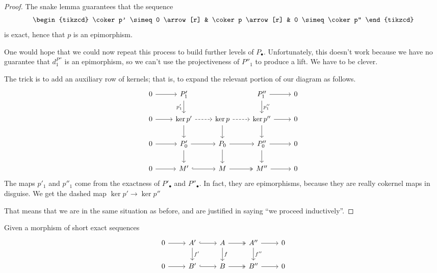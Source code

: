 \documentclass[main.tex]{subfiles}
\begin{document}
\begin{proof}
  The snake lemma guarantees that the sequence
  \begin{equation*}
    \begin{tikzcd}
      \coker p' \simeq 0
      \arrow[r]
      & \coker p
      \arrow[r]
      & 0 \simeq \coker p''
    \end{tikzcd}
  \end{equation*}
  is exact, hence that $p$ is an epimorphism.

  One would hope that we could now repeat this process to build further levels of $P_{\bullet}$. Unfortunately, this doesn't work because we have no guarantee that $d^{P''}_{1}$ is an epimorphism, so we can't use the projectiveness of $P''_{1}$ to produce a lift. We have to be clever.

  The trick is to add an auxiliary row of kernels; that is, to expand the relevant portion of our diagram as follows.
  \begin{equation*}
    \begin{tikzcd}
      0
      \arrow[r]
      & P'_{1}
      \arrow[d, swap, "p_{1}'"]
      && P''_{1}
      \arrow[r]
      \arrow[d, "p_{1}''"]
      & 0
      \\
      0
      \arrow[r]
      & \ker p'
      \arrow[r, dashed]
      \arrow[d]
      & \ker p
      \arrow[r, dashed]
      \arrow[d]
      & \ker p''
      \arrow[r]
      \arrow[d]
      & 0
      \\
      0
      \arrow[r]
      & P'_{0}
      \arrow[r]
      \arrow[d]
      & P_{0}
      \arrow[r]
      \arrow[d]
      & P''_{0}
      \arrow[r]
      \arrow[d]
      & 0
      \\
      0
      \arrow[r]
      & M'
      \arrow[r, hook]
      & M
      \arrow[r, two heads]
      & M''
      \arrow[r]
      & 0
    \end{tikzcd}
  \end{equation*}
  The maps $p'_{1}$ and $p''_{1}$ come from the exactness of $P'_{\bullet}$ and $P''_{\bullet}$. In fact, they are epimorphisms, because they are really cokernel maps in disguise. We get the dashed map $\ker p' \to \ker p''$

  That means that we are in the same situation as before, and are justified in saying ``we proceed inductively''.
\end{proof}

\begin{theorem}
  \label{thm:horseshoe_lemma_for_morphisms}
  Given a morphism of short exact sequences
  \begin{equation*}
    \begin{tikzcd}
      0
      \arrow[r]
      & A'
      \arrow[r, hook]
      \arrow[d, "f'"]
      & A
      \arrow[r, two heads]
      \arrow[d, "f"]
      & A''
      \arrow[r]
      \arrow[d, "f''"]
      & 0
      \\
      0
      \arrow[r]
      & B'
      \arrow[r, hook]
      & B
      \arrow[r, two heads]
      & B''
      \arrow[r]
      & 0
    \end{tikzcd}
  \end{equation*}
\end{theorem}
\end{document}
